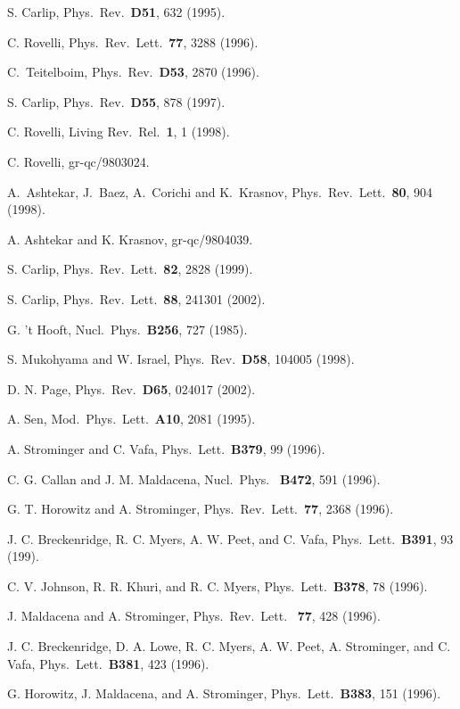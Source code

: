 \documentclass[12pt]{article} \usepackage{latexsym} \textwidth 15cm
\begin{document}
\begin{thebibliography}{99}
 S. Carlip, Phys.\ Rev.\ {\bf D51}, 632 (1995).

 C. Rovelli, Phys.\ Rev.\ Lett.\ {\bf 77}, 3288
  (1996).

 C.~Teitelboim, Phys.\ Rev.\ {\bf D53}, 2870 (1996).

 S. Carlip, Phys.\ Rev.\ {\bf D55}, 878 (1997).

 C. Rovelli, Living Rev.\ Rel.\ {\bf 1}, 1 (1998).

 C. Rovelli, gr-qc/9803024.

 A.~Ashtekar, J.~Baez, A.~Corichi and K.~Krasnov, Phys.\
  Rev.\ Lett.\ {\bf 80}, 904 (1998).

 A. Ashtekar and K. Krasnov, gr-qc/9804039. 

 S. Carlip, Phys.\ Rev.\ Lett.\ {\bf 82}, 2828 (1999).

 S. Carlip, Phys.\ Rev.\ Lett.\ {\bf 88}, 241301
  (2002).

 G. 't Hooft, Nucl.\ Phys.\ {\bf B256}, 727 (1985).

 S. Mukohyama and W. Israel, Phys.\ Rev.\ {\bf D58},
  104005 (1998).

 D. N. Page, Phys.\ Rev.\ {\bf D65}, 024017 (2002).

 A. Sen, Mod.\ Phys.\ Lett.\ {\bf A10}, 2081 (1995).

 A. Strominger and C. Vafa, Phys.\ Lett.\ {\bf B379}, 99
  (1996).

 C. G. Callan and J. M. Maldacena, Nucl.\ Phys.\ {\bf
  B472}, 591 (1996).

 G. T. Horowitz and A. Strominger, Phys.\ Rev.\ Lett.\
{\bf 77}, 2368 (1996).

 J. C. Breckenridge, R. C. Myers, A. W. Peet, and
  C. Vafa, Phys.\ Lett.\ {\bf B391}, 93 (199).

 C. V. Johnson, R. R. Khuri, and R. C. Myers, Phys.\
  Lett.\ {\bf B378}, 78 (1996).

\bibitem{MSt} J. Maldacena and A. Strominger, Phys.\ Rev.\ Lett.\ {\bf
  77}, 428 (1996).

\bibitem{BLMPSV} J. C. Breckenridge, D. A. Lowe, R. C. Myers,
  A. W. Peet, A. Strominger, and C. Vafa, Phys.\ Lett.\ {\bf B381},
  423 (1996).

\bibitem{HMS} G. Horowitz, J. Maldacena, and A. Strominger, Phys.\
  Lett.\ {\bf B383}, 151 (1996).


\end{thebibliography}
\end{document}
